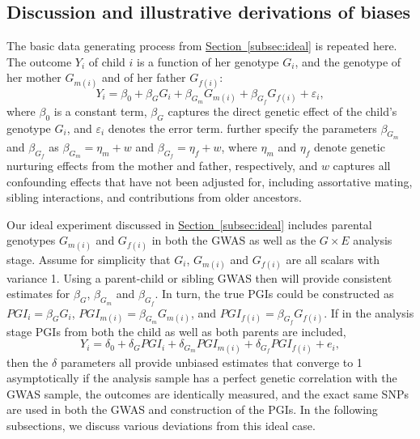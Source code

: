 \documentclass[12pt,a4paper]{article}
\begin{document}
\begin{bibunit}
\section{Discussion and illustrative derivations of biases} \label{appsec:bias}
The basic data generating process from \hyperref[subsec:ideal]{Section~\ref*{subsec:ideal}} is repeated here. The outcome $Y_i$ of child $i$ is a function of her genotype $G_i$, and the genotype of her mother $G_{m(i)}$ and of her father $G_{f(i)}$:
\begin{equation}
Y_i = \beta_0 + \beta_G G_i + \beta_{G_m} G_{m(i)} + \beta_{G_f} G_{f(i)} + \varepsilon_i,
\label{eq:Kong1app}
\end{equation}
where $\beta_0$ is a constant term, $\beta_G$ captures the direct genetic effect of the child's genotype $G_i$, and $\varepsilon_i$ denotes the error term. \citet{kong2020family} further specify the parameters $\beta_{G_m}$ and $\beta_{G_f}$ as $\beta_{G_m} = \eta_m +w$ and  $\beta_{G_f} = \eta_f +w$, where $\eta_m$ and $\eta_f$ denote genetic nurturing effects from the mother and father, respectively, and $w$ captures all confounding effects that have not been adjusted for, including assortative mating, sibling interactions, and contributions from older ancestors. 

Our ideal experiment discussed in \hyperref[subsec:ideal]{Section~\ref*{subsec:ideal}} includes parental genotypes $G_{m(i)}$ and $G_{f(i)}$ in both the GWAS as well as the $G \times E$ analysis stage. Assume for simplicity that $G_i$, $G_{m(i)}$ and $G_{f(i)}$ are all scalars with variance 1. Using a parent-child or sibling GWAS then will provide consistent estimates for $\beta_G$, $\beta_{G_m}$ and $\beta_{G_f}$. In turn, the true PGIs could be constructed as $PGI_i = \beta_G G_i$, $PGI_{m(i)} = \beta_{G_m} G_{m(i)}$, and $PGI_{f(i)} = \beta_{G_f} G_{f(i)}$. If in the analysis stage PGIs from both the child as well as both parents are included,
\begin{equation} 
    Y_i = \delta_0 + \delta_G PGI_{i} + \delta_{G_m} PGI_{m(i)} + \delta_{G_f} PGI_{f(i)} + e_i,
\end{equation}
then the $\delta$ parameters all provide unbiased estimates that converge to 1 asymptotically if the analysis sample has a perfect genetic correlation with the GWAS sample, the outcomes are identically measured, and the exact same SNPs are used in both the GWAS and construction of the PGIs. In the following subsections, we discuss various deviations from this ideal case. 




\end{bibunit}
\end{document}
